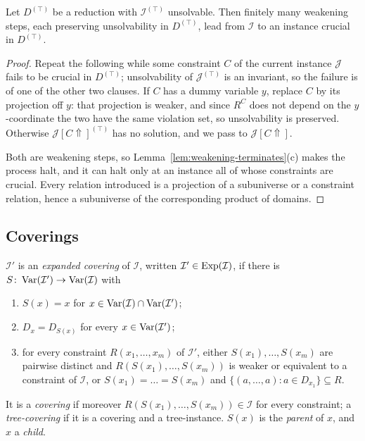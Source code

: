 \begin{proposition}\label{rem:get-crucial}
Let $D^{(\top)}$ be a reduction with $\mathcal I^{(\top)}$ unsolvable. Then
finitely many weakening steps, each preserving unsolvability in $D^{(\top)}$,
lead from $\mathcal I$ to an instance crucial in $D^{(\top)}$.
\end{proposition}

\begin{proof}
Repeat the following while some constraint $C$ of the current instance
$\mathcal J$ fails to be crucial in $D^{(\top)}$; unsolvability of
$\mathcal J^{(\top)}$ is an invariant, so the failure is of one of the other
two clauses. If $C$ has a dummy variable $y$, replace $C$ by its projection off
$y$: that projection is weaker, and since $R^{C}$ does not depend on the
$y$-coordinate the two have the same violation set, so unsolvability is
preserved. Otherwise $\mathcal J[C\Uparrow]^{(\top)}$ has no solution, and we
pass to $\mathcal J[C\Uparrow]$.

Both are weakening steps, so Lemma~\ref{lem:weakening-terminates}(c) makes the
process halt, and it can halt only at an instance all of whose constraints are
crucial. Every relation introduced is a projection of a subuniverse or a
constraint relation, hence a subuniverse of the corresponding product of
domains.
\end{proof}

\subsection{Coverings}\label{sec:coverings}

\begin{definition}\label{def:expanded}
$\mathcal I'$ is an \emph{expanded covering} of $\mathcal I$, written
$\mathcal I'\in\operatorname{Exp}(\mathcal I)$, if there is
$S\colon\operatorname{Var}(\mathcal I')\to\operatorname{Var}(\mathcal I)$ with
\begin{enumerate}\romanlabels\tightlist
\item $S(x)=x$ for $x\in\operatorname{Var}(\mathcal I)\cap\operatorname{Var}(\mathcal I')$;
\item $D_{x}=D_{S(x)}$ for every $x\in\operatorname{Var}(\mathcal I')$;
\item for every constraint $R(x_{1},\dots,x_{m})$ of $\mathcal I'$, either
  $S(x_{1}),\dots,S(x_{m})$ are pairwise distinct and
  $R(S(x_{1}),\dots,S(x_{m}))$ is weaker or equivalent to a constraint of
  $\mathcal I$, or $S(x_{1})=\dots=S(x_{m})$ and
  $\{(a,\dots,a):a\in D_{x_{1}}\}\subseteq R$.
\end{enumerate}
It is a \emph{covering} if moreover $R(S(x_{1}),\dots,S(x_{m}))\in\mathcal I$
for every constraint; a \emph{tree-covering} if it is a covering and a
tree-instance. $S(x)$ is the \emph{parent} of $x$, and $x$ a \emph{child}.
\end{definition}


